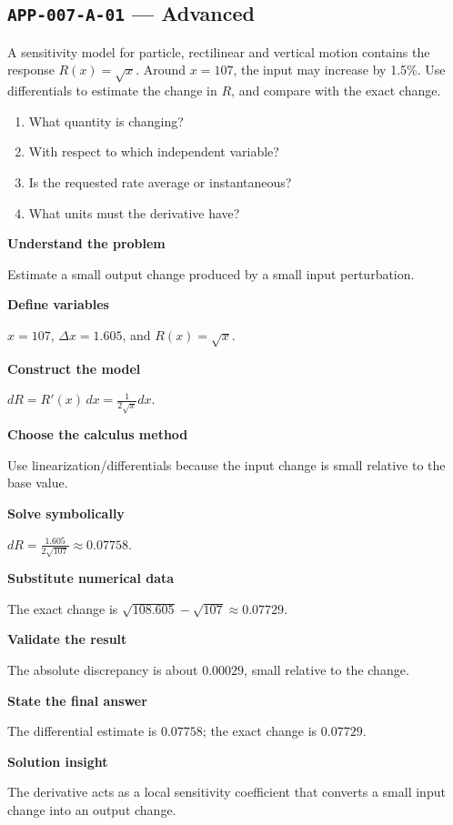 \documentclass[11pt]{book}
\newcommand{\pid}[1]{\texttt{#1}}
\begin{document}
\subsection*{\pid{APP-007-A-01} — Advanced}
\begin{problembox}
A sensitivity model for particle, rectilinear and vertical motion contains the response $R(x)=\sqrt{x}$. Around $x=107$, the input may increase by 1.5\%. Use differentials to estimate the change in $R$, and compare with the exact change.
\end{problembox}
\begin{promptbox}\begin{enumerate}
\item What quantity is changing?
\item With respect to which independent variable?
\item Is the requested rate average or instantaneous?
\item What units must the derivative have?
\end{enumerate}\end{promptbox}
\begin{solutionbox}
\textbf{Understand the problem}\par Estimate a small output change produced by a small input perturbation.\par\medskip
\textbf{Define variables}\par $x=107$, $\Delta x=1.605$, and $R(x)=\sqrt x$.\par\medskip
\textbf{Construct the model}\par $dR=R'(x)\,dx=\frac{1}{2\sqrt{x}}dx$.\par\medskip
\textbf{Choose the calculus method}\par Use linearization/differentials because the input change is small relative to the base value.\par\medskip
\textbf{Solve symbolically}\par $dR=\frac{1.605}{2\sqrt{107}}\approx 0.07758$.\par\medskip
\textbf{Substitute numerical data}\par The exact change is $\sqrt{108.605}-\sqrt{107}\approx 0.07729$.\par\medskip
\textbf{Validate the result}\par The absolute discrepancy is about $0.00029$, small relative to the change.\par\medskip
\textbf{State the final answer}\par The differential estimate is $0.07758$; the exact change is $0.07729$.\par\medskip
\textbf{Solution insight}\par The derivative acts as a local sensitivity coefficient that converts a small input change into an output change.\par\medskip
\end{solutionbox}
\end{document}

